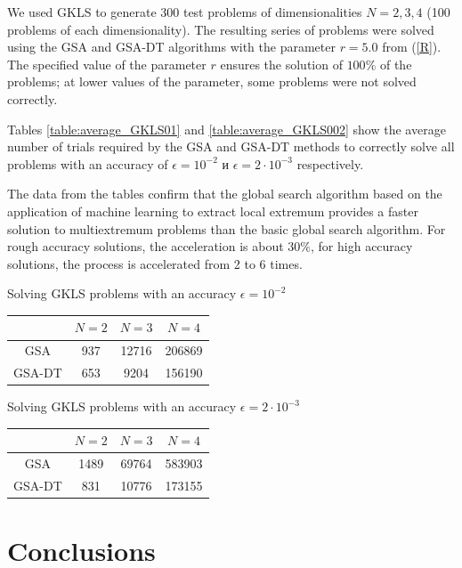 \documentclass[entropy,article,submit,moreauthors,pdftex]{Definitions/mdpi}
\begin{document}
We used GKLS to generate 300 test problems of dimensionalities $N=2,3,4$ (100 problems of each dimensionality).
The resulting series of problems were solved using the GSA and GSA-DT algorithms with the parameter $r=5.0$ from (\ref{R}). The specified value of the parameter $r$ ensures the solution of  $100\%$ of the problems; at lower values of the parameter, some problems were not solved correctly.

Tables \ref{table:average_GKLS01} and \ref{table:average_GKLS002} show the average number of trials required by the GSA and GSA-DT methods to correctly solve all problems with an accuracy of $\epsilon = 10^{-2}$ и $\epsilon = 2 \cdot 10^{-3}$ respectively.

The data from the tables confirm that the global search algorithm based on the application of machine learning to extract local extremum provides a faster solution to multiextremum problems than the basic global search algorithm. For rough accuracy solutions, the acceleration is about  $30\%$, for high accuracy solutions, the process is accelerated from 2 to 6 times.

\begin{specialtable}[H] 
	\caption{Solving GKLS problems with an accuracy  $\epsilon = 10^{-2}$}\label{table:average_GKLS01}
	\center
\begin{tabular}{cccc}
\toprule
        & $N=2$ & $N=3$  & $N=4$    \\
\midrule
GSA     &  937  &  12716 &  206869  \\
GSA-DT  &  653  &  9204  &  156190  \\
\bottomrule
\end{tabular}
\end{specialtable}

\begin{specialtable}[H] 
	\caption{Solving GKLS problems with an accuracy $\epsilon = 2 \cdot 10^{-3}$}\label{table:average_GKLS002}
	\center
\begin{tabular}{cccc}
\toprule

       & $N=2$ & $N=3$  & $N=4$    \\
\midrule
GSA    & 1489  & 69764  & 583903  \\
GSA-DT & 831   & 10776  & 173155   \\
\bottomrule
\end{tabular}
\end{specialtable}



\section{Conclusions}
\end{document}
